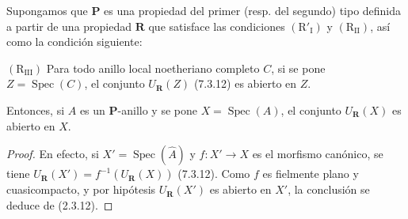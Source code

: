 \begin{proposition}[7.3.18]
\label{IV.2.s7.3.18-fr}
Supongamos que $\boldsymbol P$ es una propiedad del primer \textup{(resp.} del
segundo) tipo definida a partir de una propiedad $\boldsymbol R$ que
satisface las condiciones $(\mathrm R'_{\mathrm I})$ y
$(\mathrm R_{\mathrm{II}})$, así como la condición siguiente:

$(\mathrm R_{\mathrm{III}})$ Para todo anillo local noetheriano \textup{completo}
$C$, si se pone $Z=\operatorname{Spec}(C)$, el conjunto
$U_{\mathbf{R}}(Z)$ \textup{(7.3.12)} es abierto en $Z$.

Entonces, si $A$ es un $\boldsymbol P$-anillo y se pone
$X=\operatorname{Spec}(A)$, el conjunto $U_{\mathbf{R}}(X)$ es
abierto en $X$.
\end{proposition}

\begin{proof}
En efecto, si $X'=\operatorname{Spec}(\widehat A)$ y $f:X'\to X$ es
el morfismo canónico, se tiene
$U_{\mathbf{R}}(X')=f^{-1}(U_{\mathbf{R}}(X))$ (7.3.12).
Como $f$ es fielmente plano y cuasicompacto, y por hipótesis
$U_{\mathbf{R}}(X')$ es abierto en $X'$, la conclusión se deduce
de (2.3.12).
\end{proof}
